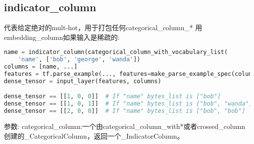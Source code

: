 \subsection{indicator\_column}
代表给定绝对的mult-hot，用于打包任何categorical\_column\_* 用embedding\_column如果输入是稀疏的:
\begin{lstlisting}[language=Python]
name = indicator_column(categorical_column_with_vocabulary_list(
    'name', ['bob', 'george', 'wanda'])
columns = [name, ...]
features = tf.parse_example(..., features=make_parse_example_spec(columns))
dense_tensor = input_layer(features, columns)

dense_tensor == [[1, 0, 0]]  # If "name" bytes_list is ["bob"]
dense_tensor == [[1, 0, 1]]  # If "name" bytes_list is ["bob", "wanda"]
dense_tensor == [[2, 0, 0]]  # If "name" bytes_list is ["bob", "bob"]
\end{lstlisting}
参数:
categorical\_column:一个由categorical\_column\_with*或者crossed\_column创建的\_CategoricalColumn，返回一个\_IndicatorColumn。
